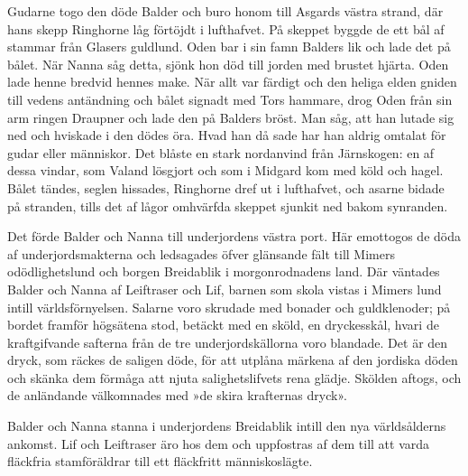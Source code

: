Gudarne togo den döde Balder och buro honom till Asgards västra strand,
där hans skepp Ringhorne låg förtöjdt i lufthafvet. På skeppet byggde de
ett bål af stammar från Glasers guldlund. Oden bar i sin famn Balders
lik och lade det på bålet. När Nanna såg detta, sjönk hon död till
jorden med brustet hjärta. Oden lade henne bredvid hennes make. När allt
var färdigt och den heliga elden gniden till vedens antändning och bålet
signadt med Tors hammare, drog Oden från sin arm ringen Draupner och
lade den på Balders bröst. Man såg, att han lutade sig ned och hviskade
i den dödes öra.
\protect\hypertarget{lb1625905.xhtmlux5cux23start89}{}{}\protect\hypertarget{lb1625905.xhtmlux5cux23start89-a}{}{}\protect\hypertarget{lb1625905.xhtmlux5cux23start89-b}{}{}\protect\hypertarget{lb1625905.xhtmlux5cux23start89-c}{}{}\protect\hypertarget{lb1625905.xhtmlux5cux23start89-d}{}{}
Hvad han då sade har han aldrig omtalat för gudar eller människor. Det
blåste en stark nordanvind från Järnskogen: en af dessa vindar, som
Valand lösgjort och som i Midgard kom med köld och hagel. Bålet tändes,
seglen hissades, Ringhorne dref ut i lufthafvet, och asarne bidade på
stranden, tills det af lågor omhvärfda skeppet sjunkit ned bakom
synranden.

Det förde Balder och Nanna till underjordens västra port. Här emottogos
de döda af underjordsmakterna och ledsagades öfver glänsande fält till
Mimers odödlighetslund och borgen Breidablik i morgonrodnadens land. Där
väntades Balder och Nanna af Leiftraser och Lif, barnen som skola vistas
i Mimers lund intill världsförnyelsen. Salarne voro skrudade med bonader
och guldklenoder; på bordet framför högsätena stod, betäckt med en
sköld, en dryckesskål, hvari de kraftgifvande safterna från de tre
underjordskällorna voro blandade. Det är den dryck, som räckes de
saligen döde, för att utplåna märkena af den jordiska döden och skänka
dem förmåga att njuta salighetslifvets rena glädje. Skölden aftogs, och
de anländande välkomnades med »de skira krafternas dryck».

Balder och Nanna stanna i underjordens Breidablik intill den nya
världsålderns ankomst. Lif och Leiftraser äro hos dem och uppfostras af
dem till att varda fläckfria stamföräldrar till ett fläckfritt
människoslägte.

